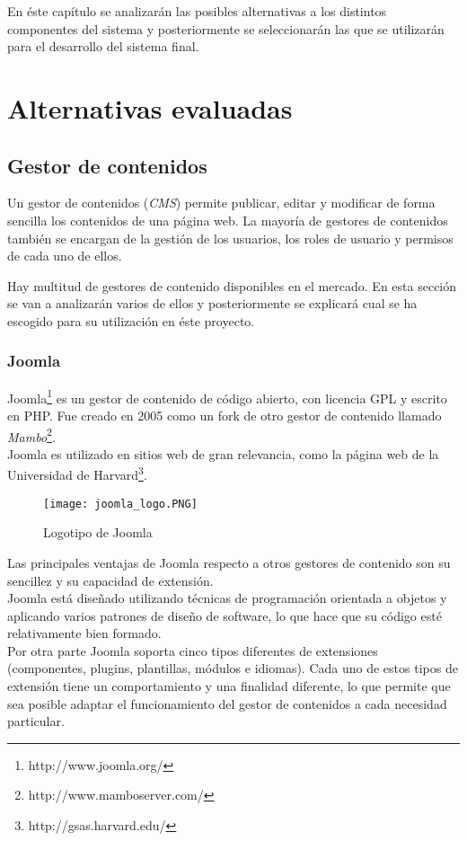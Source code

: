 En éste capítulo se analizarán las posibles alternativas a los distintos componentes del sistema y posteriormente se seleccionarán las que se utilizarán para el desarrollo del sistema final.

\section{Alternativas evaluadas}

\subsection{Gestor de contenidos}
Un gestor de contenidos (\textit{CMS}) permite publicar, editar y modificar de forma sencilla los contenidos de una página web.  La mayoría de gestores de contenidos también se encargan de la gestión de los usuarios, los roles de usuario y permisos de cada uno de ellos.

Hay multitud de gestores de contenido disponibles en el mercado. En esta sección se van a analizarán varios de ellos y posteriormente se explicará cual se ha escogido para su utilización en éste proyecto.


\subsubsection{Joomla}
Joomla\footnote{http://www.joomla.org/} es un gestor de contenido de código abierto, con licencia GPL y escrito en PHP.  Fue creado en 2005 como un fork de otro gestor de contenido llamado \textit{Mambo}\footnote{http://www.mamboserver.com/}.\\
Joomla es utilizado en sitios web de gran relevancia, como la página web de la Universidad de Harvard\footnote{http://gsas.harvard.edu/}.

\begin{figure}[h]
\centering
\texttt{[image: joomla\_logo.PNG]}
\caption{Logotipo de Joomla}
\end{figure}

Las principales ventajas de Joomla respecto a otros gestores de contenido son su sencillez y su capacidad de extensión.\\
Joomla está diseñado utilizando técnicas de programación orientada a objetos y aplicando varios patrones de diseño de software, lo que hace que su código esté relativamente bien formado.\\
Por otra parte Joomla soporta cinco tipos diferentes de extensiones (componentes, plugins, plantillas, módulos e idiomas).  Cada uno de estos tipos de extensión tiene un comportamiento y una finalidad diferente, lo que permite que sea posible adaptar el funcionamiento del gestor de contenidos a cada necesidad particular.


